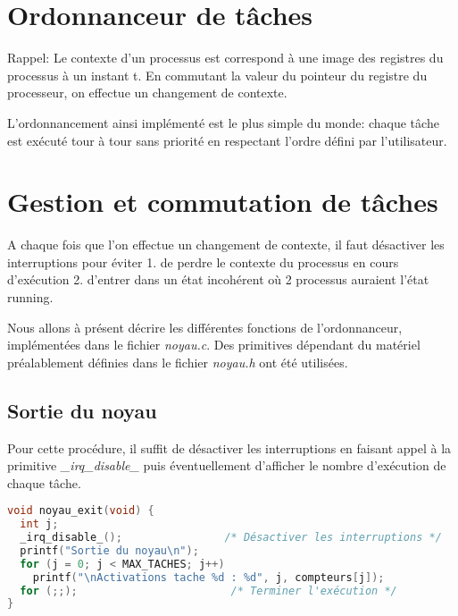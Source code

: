 \section{Ordonnanceur de tâches}
Rappel: Le contexte d'un processus est correspond à une image des registres du processus à un instant t. En commutant la valeur du pointeur du registre du processeur, on effectue un changement de contexte.


L'ordonnancement ainsi implémenté est le plus simple du monde: chaque tâche est exécuté tour à tour sans priorité en respectant l'ordre défini par l'utilisateur.



\section{Gestion et commutation de tâches}
A chaque fois que l'on effectue un changement de contexte, il faut désactiver les interruptions pour éviter 1. de perdre le contexte du processus en cours d'exécution 2. d'entrer dans un état incohérent où 2 processus auraient l'état running.

Nous allons à présent décrire les différentes fonctions de l'ordonnanceur, implémentées dans le fichier \textit{noyau.c}. Des primitives dépendant du matériel préalablement définies dans le fichier \textit{noyau.h} ont été utilisées.

\subsection{Sortie du noyau}
Pour cette procédure, il suffit de désactiver les interruptions en faisant appel à la primitive \textit{\_irq\_disable\_} puis éventuellement d'afficher le nombre d'exécution de chaque tâche.
\begin{lstlisting}[language=C, caption=noyau.c]
void noyau_exit(void) {
  int j;
  _irq_disable_();                /* Désactiver les interruptions */
  printf("Sortie du noyau\n");
  for (j = 0; j < MAX_TACHES; j++)
    printf("\nActivations tache %d : %d", j, compteurs[j]);
  for (;;);                        /* Terminer l'exécution */
}
\end{lstlisting}

